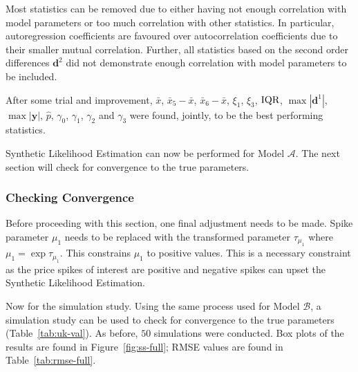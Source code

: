 Most statistics can be removed due to either having not enough correlation with model parameters or too much correlation with other statistics. In particular, autoregression coefficients are favoured over autocorrelation coefficients due to their smaller mutual correlation. Further, all statistics based on the second order differences $\pmb{d}^2$ did not demonstrate enough correlation with model parameters to be included.

After some trial and improvement, $\bar{x}$, $\bar{x}_5 - \bar{x}$, $\bar{x}_6 - \bar{x}$, $\xi_1$, $\xi_3$, $\mathop{}\!\text{IQR}{}$, $\max{|\pmb{d}^1|}$, $\max{|\pmb{y}|}$, $\hat{p}$, $\gamma_0$, $\gamma_1$, $\gamma_2$ and $\gamma_3$ were found, jointly, to be the best performing statistics.

Synthetic Likelihood Estimation can now be performed for Model $\mathcal{A}$. The next section will check for convergence to the true parameters.

\subsubsection{Checking Convergence}

Before proceeding with this section, one final adjustment needs to be made. Spike parameter $\mu_1$ needs to be replaced with the transformed parameter $\tau_{\mu_1}$ where $\mu_1 = \exp{\tau_{\mu_1}}$. This constrains $\mu_1$ to positive values. This is a necessary constraint as the price spikes of interest are positive and negative spikes can upset the Synthetic Likelihood Estimation.

Now for the simulation study. Using the same process used for Model $\mathcal{B}$, a simulation study can be used to check for convergence to the true parameters (Table~\ref{tab:uk-val}). As before, $50$ simulations were conducted. Box plots of the results are found in Figure~\ref{fig:ss-full}; RMSE values are found in Table~\ref{tab:rmse-full}.

\begin{table}[H]
\caption{Root Mean Squared Errors for Model $\mathcal{A}$}
\label{tab:rmse-full}
\end{table}

